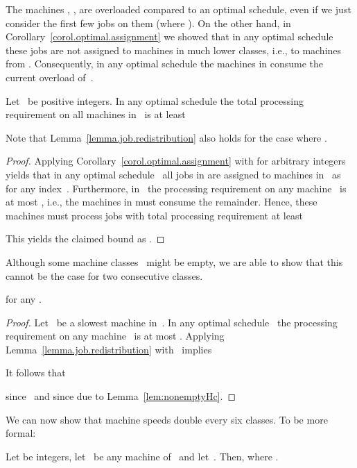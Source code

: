 \documentclass[a4paper,11pt,fleqn]{article}
\begin{document}
The machines , , are overloaded compared to an optimal schedule,
even if we just consider the first few jobs  on them (where ). On the other hand, in Corollary~\ref{corol.optimal.assignment} we showed that in any optimal schedule these jobs are not assigned to machines in much lower classes, i.e., to machines from . Consequently, in any optimal schedule the machines in  consume the current overload of~.

\begin{lemma}
\label{lemma.job.redistribution}
Let~ be positive integers. In any optimal schedule the total processing requirement on all machines in~ is at least

\end{lemma}

Note that Lemma~\ref{lemma.job.redistribution} also holds for the case  where .

\begin{proof}
Applying Corollary~\ref{corol.optimal.assignment} with  for arbitrary integers~ yields that in any optimal schedule~ all jobs in
 are assigned to machines in~ as
 for any index~. Furthermore, in~
the processing requirement on any machine~ is at most , i.e., the machines in  must consume the remainder. Hence, these machines must process jobs with total processing requirement at least

This yields the claimed bound as .
\end{proof}

Although some machine classes~ might be empty, we are able to show that this cannot be the case for two consecutive classes.

\begin{lemma}
\label{lemma.no.neighboring.classes.empty}
 for any .
\end{lemma}

\begin{proof}
Let~ be a slowest machine in~. In any optimal schedule~
the processing requirement on any machine~
is at most .
Applying Lemma~\ref{lemma.job.redistribution} with~ implies

It follows that 

since~ and since  due to Lemma~\ref{lem:nonemptyHc}.
\end{proof}

We can now show that machine speeds double every six classes. To be more formal:

\begin{lemma}
\label{lemma.exponentially.decreasing.speeds}
Let  be integers, let~ be any machine of~
and let~. Then,  where .
\end{lemma}
\end{document}

